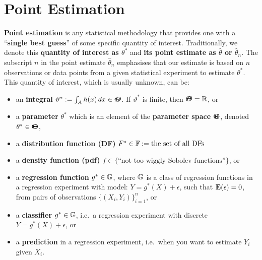 \section{Point Estimation}\label{S:PointEstimation}
{\bf Point estimation} is any statistical methodology that provides one with a ``{\bf single best guess}'' of some specific quantity of interest.  Traditionally, we denote this {\bf quantity of interest as $\theta^*$} and {\bf its point estimate as $\widehat{\theta}$ or $\widehat{\theta}_n$}.  The subscript $n$ in the point estimate $\widehat{\theta}_n$ emphasises that our estimate is based on $n$ observations or data points from a given statistical experiment to estimate $\theta^*$.  This quantity of interest, which is usually unknown, can be: %
\begin{itemize}
\item an {\bf integral} $\vartheta^* := \int_A h(x)\,dx \in {\varTheta}\mspace{-11 mu}{\varTheta}$.  If $\vartheta^*$ is finite, then ${\varTheta}\mspace{-11 mu}{\varTheta} =  \mathbb{R}$, or %
\item a {\bf parameter} $\theta^*$ which is an element of the {\bf parameter space} ${\Theta}\mspace{-11 mu}{\Theta}$, denoted $\theta^* \in {\Theta}\mspace{-11 mu}{\Theta}$,
\item a {\bf distribution function (DF)} $F^* \in \mathbb{F} := \text{the set of all DFs}$
\item a {\bf density function (pdf)} $f \in \{ \text{``not too wiggly Sobolev functions''} \}$, or 
\item a {\bf regression function} $g^* \in \mathbb{G}$, where $\mathbb{G}$ is a class of regression functions in a regression experiment with model: $Y=g^*(X)+\epsilon$, such that $\mathbf{E}(\epsilon)=0$, from pairs of observations $\{(X_i,Y_i)\}_{i=1}^n$, or
\item a {\bf classifier} $g^* \in \mathbb{G}$, i.e.~a regression experiment with discrete $Y = g^*(X)+\epsilon$, or 
\item a {\bf prediction} in a regression experiment, i.e.~when you want to estimate $Y_i$ given $X_i$. 
\end{itemize}

